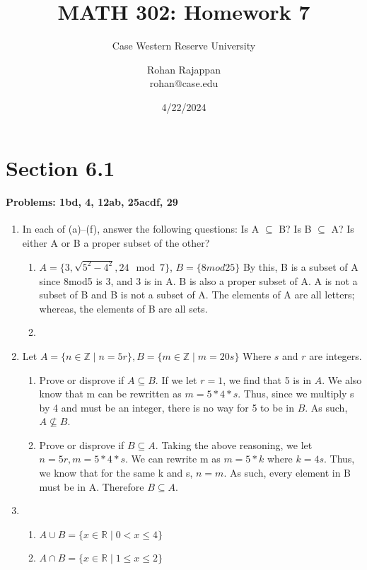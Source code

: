 \documentclass{article}
\title{MATH 302: Homework 7}
\subtitle{Case Western Reserve University}
\author{Rohan Rajappan \\rohan@case.edu}
\date{4/22/2024}
\makeatletter
\newcommand\setItemnumber[1]{\setcounter{enum\romannumeral\@enumdepth}{\numexpr#1-1\relax}}
\makeatother
\begin{document}
\maketitle

\section{Section 6.1}
\paragraph{Problems: 1bd, 4, 12ab, 25acdf, 29}
\begin{enumerate}
    \item In each of (a)–(f), answer the following questions: Is A $\subseteq$ B? Is B $\subseteq$ A? Is either A or B a proper subset of the other?
    \begin{enumerate}
        \setItemnumber{2}
        \item $A=\{3,\sqrt{5^2-4^2},24\mod{7}\}$, $B = \{8mod25\}$
        By this, B is a subset of A since 8mod5 is 3, and 3 is in A. B is also a proper subset of A.
        \setItemnumber{4} A is not a subset of B and B is not a subset of A. The elements of A are all letters; whereas, the elements of B are all sets.
        \item 
    \end{enumerate}
    \setItemnumber{4}
    \item Let $A = \{n\in\mathbb{Z} \mid n=5r\}, B=\{m\in\mathbb{Z}\mid m=20s\}$ Where $s$ and $r$ are integers.
    \begin{enumerate}
        \item Prove or disprove if $A\subseteq B$. If we let $r=1$, we find that 5 is in $A$. We also know that m can be rewritten as $m=5*4*s$. Thus, since we multiply s by 4 and must be an integer, there is no way for 5 to be in $B$. As such, $A\nsubseteq B$.
        \item Prove or disprove if $B\subseteq A$. Taking the above reasoning, we let $n=5r, m=5*4*s$. We can rewrite m as $m=5*k$ where $k=4s$. Thus, we know that for the same k and s, $n=m$. As such, every element in B must be in A. Therefore $B\subseteq A$.
    \end{enumerate}
    \setItemnumber{12}
    \item 
    \begin{enumerate}
        \item $A\cup B = \{x\in\mathbb{R} \mid 0<x\leq4\}$
        \item $A\cap B = \{x\in\mathbb{R} \mid 1\leq x\leq2\}$

\end{enumerate}
\end{enumerate}
\end{document}
